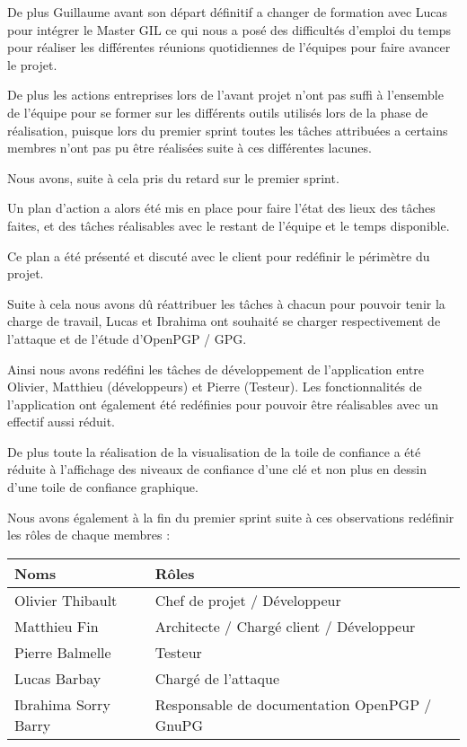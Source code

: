 \documentclass{../res/univ-projet}
\begin{document}
    De plus Guillaume avant son départ définitif a changer de formation avec Lucas pour intégrer le Master GIL
    ce qui nous a posé des difficultés d'emploi du temps pour réaliser les différentes réunions quotidiennes
    de l'équipes pour faire avancer le projet.

    De plus les actions entreprises lors de l'avant projet n'ont pas suffi à l'ensemble de l'équipe 
    pour se former sur les différents outils utilisés lors de la phase de réalisation,
    puisque lors du premier sprint toutes les tâches attribuées a certains membres n'ont pas pu être
    réalisées suite à ces différentes lacunes.

    Nous avons, suite à cela pris du retard sur le premier sprint.

    Un plan d'action a alors été mis en place pour faire l'état des lieux des tâches
    faites, et des tâches réalisables avec le restant de l'équipe et le temps disponible.

    Ce plan a été présenté et discuté avec le client pour redéfinir le périmètre du projet.

    Suite à cela nous avons dû réattribuer les tâches à chacun pour pouvoir tenir la charge de travail,
    Lucas et Ibrahima ont souhaité se charger respectivement de l'attaque et de l'étude d'OpenPGP / GPG.

    Ainsi nous avons redéfini les tâches de développement de l'application
    entre Olivier, Matthieu (développeurs) et Pierre (Testeur).
    Les fonctionnalités de l'application ont également été redéfinies pour pouvoir être réalisables avec un effectif
    aussi réduit.

    De plus toute la réalisation de la visualisation de la toile de confiance a été réduite
    à l'affichage des niveaux de confiance d'une clé et non plus en dessin d'une toile de confiance graphique.

    Nous avons également à la fin du premier sprint suite à ces observations redéfinir les rôles de chaque membres : 

    \begin{tabular}{|l|l|}
      \hline
      \bfseries{Noms}      & \bfseries{Rôles}                             \\
      \hline
      Olivier Thibault     & Chef de projet / Développeur                 \\
      Matthieu Fin         & Architecte / Chargé client / Développeur     \\
      Pierre Balmelle      & Testeur                                      \\
      Lucas Barbay         & Chargé de l'attaque                          \\
      Ibrahima Sorry Barry & Responsable de documentation OpenPGP / GnuPG \\
      \hline

    \end{tabular}
\end{document}

